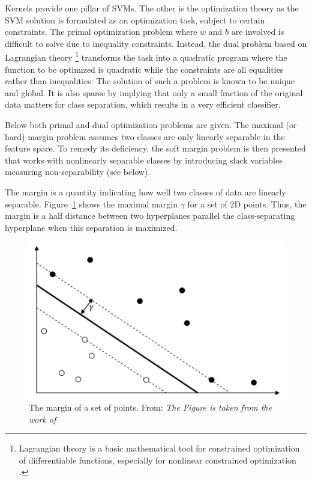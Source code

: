 Kernels provide one pillar of SVMs. The other is the optimization theory as the SVM solution is formulated as an optimization task, subject to certain constraints. The primal optimization problem where \( w \) and \( b \) are involved is difficult to solve due to inequality constraints. Instead, the dual problem based on  Lagrangian theory \footnote{Lagrangian theory is a basic mathematical tool for constrained optimization of differentiable functions, especially for nonlinear constrained optimization \cite{Li:2008}.} transforms the task into a quadratic program where the function to be optimized is quadratic while the constraints are all equalities rather than inequalities. The solution of such a problem is known to be unique and global. It is also sparse by implying that only a small fraction of the original data matters for class separation, which results in a very efficient classifier.

Below both primal and dual optimization problems are given. The maximal (or hard) margin problem assumes two classes are only linearly separable in the feature space. To remedy its deficiency, the soft margin problem is then presented that works with nonlinearly separable classes by introducing slack variables measuring non-separability (see below).

The margin is a quantity indicating how well two classes of data are linearly separable. Figure~\ref{fig:hyperplane3} shows the maximal margin $\gamma$ for a set of 2D points. Thus, the margin is a half distance between two hyperplanes parallel the class-separating hyperplane when this separation is maximized.
\begin{figure}[h!]
    \centering
    \includegraphics[scale=0.6]{Graphics/svm-margins.png}
    \caption{
        The margin of a set of points.
         From: \textit{The Figure is taken from the work of}~\protect\cite{Okun;Valentini:2009}
    }
    \label{fig:hyperplane3}
\end{figure}


